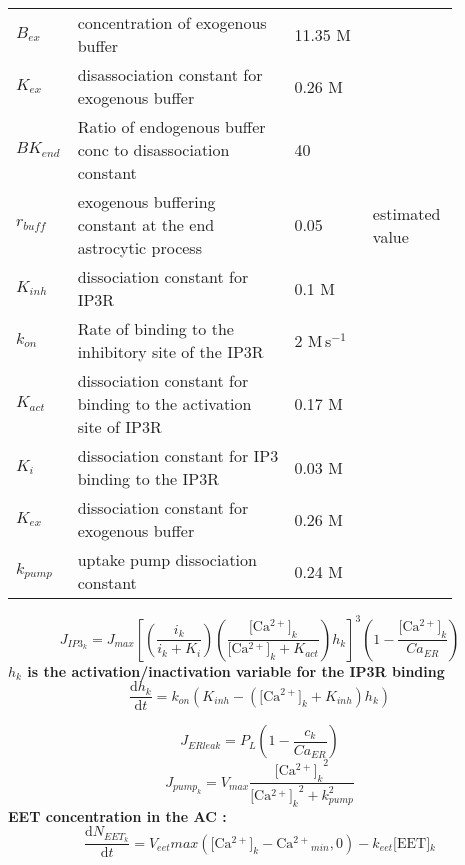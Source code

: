 \documentclass[fleqn]{report}
\numberwithin{equation}{section}
\numberwithin{equation}{section}
\newcommand{\Ca}{\text{Ca$^{2+}$}}
\newcommand{\EETk}{\text{[EET]$_{k}$}}
\newcommand{\Cak}{\text{[Ca$^{2+}]_k$}}
\newcommand{\microM}{\textmu M}
\newcommand{\uMpers}{\textmu M\,s$^{-1}$}
\begin{document}
			\begin{table}[h!]
										\centering
										\begin{tabular}{ p{0.07\linewidth}  >{\footnotesize} p{0.47\linewidth}  >{\footnotesize} p{0.17\linewidth} >{\footnotesize} p{0.17\linewidth} }
											\hline
											$ B_{ex} $ 	& concentration of exogenous buffer	& 11.35 \microM 	& \\ 
											$ K_{ex} $ 		& disassociation constant for exogenous buffer	& 0.26 \microM 	& \\ 
											$ BK_{end} $ 		& Ratio of endogenous buffer conc to disassociation constant 	& 40 				& \\ 
											$ r_{buff} $ 		&  exogenous buffering constant at the end astrocytic process & 0.05 				&  estimated value \\ 
											$ K_{inh} $ 	& dissociation constant for IP3R	& 0.1 \microM 	& \\ 
											$ k_{on} $ 		& Rate of \Ca binding to the inhibitory site of the IP3R & 2  \uMpers 	& \\ 
											$ K_{act} $ 	& dissociation constant for binding to the activation site of IP3R	& 0.17 \microM 	& \\ 
											$ K_{i} $ 	& dissociation constant for IP3 binding to the IP3R	& 0.03 \microM 	& \\ 
												$ K_{ex} $ 	& dissociation constant for exogenous buffer	& 0.26 \microM 	& \\ 
												$ k_{pump} $ 	& \Ca uptake pump dissociation constant	& 0.24 \microM 	& \\ 
											\hline
										\end{tabular}
									\end{table}
				
		\begin{equation}
	J_{IP3_{k}}=J_{max}[(\frac{i_k}{i_k+K_{i}})(\frac{\Cak}{\Cak+K_{act}})h_{k}]^{3}(1-\frac{\Cak}{Ca_{ER}})
		\end{equation}
		\textbf{$h_{k}$ is the activation/inactivation variable for the IP3R binding}
		\begin{equation}\label{eq:hk}
		\dfrac{\mathrm{d}h_{k}}{\mathrm{d}t}= k_{on}(K_{inh}-(\Cak+K_{inh})h_{k})
		\end{equation}
		
		\begin{equation}
		J_{ERleak}=P_{L}(1-\frac{c_{k}}{Ca_{ER}})
		\end{equation}
		\begin{equation}
		J_{pump_{k}}=V_{max}\frac{\Cak^{2}}{\Cak^{2}+k^{2}_{pump}}
		\end{equation}
	\textbf{EET concentration in the AC  :}
		\begin{equation} \label{eq:EETInt}
		\dfrac{\mathrm{d}N_{EET_k}}{\mathrm{d}t}= V_{eet}max(\Cak-\Ca_{min},0)-k_{eet}\EETk
		\end{equation}
\end{document}
